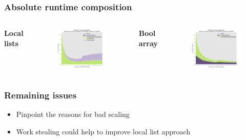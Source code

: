 \begin{frame}
 \frametitle{Absolute runtime composition}
 \begin{columns}[T]
  \bfseries{Local lists}
  \begin{figure}[!ht]
    \begin{center}
      \includegraphics[width=\textwidth]{img/timeabs_locallist_gtSOFTWARE_s1000000_opt0.pdf}
    \end{center}
  \end{figure}

  \bfseries{Bool array}
  \begin{figure}[!ht]
    \begin{center}
      \includegraphics[width=\textwidth]{img/timeabs_bitset_gtSOFTWARE_s1000000_opt1.pdf}
    \end{center}
  \end{figure}
\end{columns}
 
\end{frame}



\begin{frame}
 \frametitle{Remaining issues}
 \begin{itemize}
	 \item Pinpoint the reasons for bad scaling
	 \item Work stealing could help to improve local list approach
 \end{itemize}
\end{frame}


 
